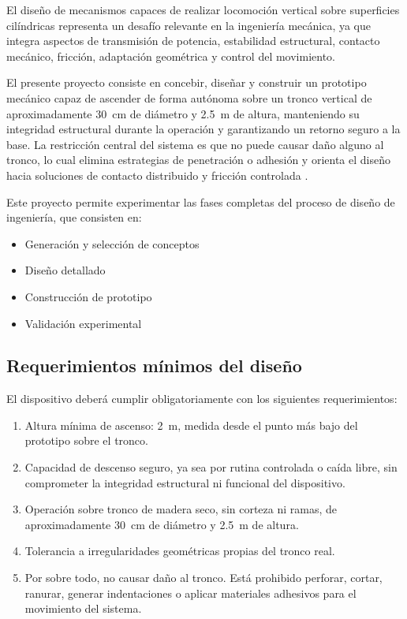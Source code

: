 \documentclass[lettersize,journal]{IEEEtran}
\begin{document}
El diseño de mecanismos capaces de realizar locomoción vertical sobre superficies
cilíndricas representa un desafío relevante en la ingeniería mecánica, ya que integra
aspectos de transmisión de potencia, estabilidad estructural, contacto mecánico,
fricción, adaptación geométrica y control del movimiento.

El presente proyecto consiste en concebir, diseñar y construir un prototipo mecánico
capaz de ascender de forma autónoma sobre un tronco vertical de aproximadamente
\SI{30}{\centi\meter} de diámetro y \SI{2.5}{\meter} de altura, manteniendo su
integridad estructural durante la operación y garantizando un retorno seguro a la base.
La restricción central del sistema es que no puede causar daño alguno al tronco, lo
cual elimina estrategias de penetración o adhesión y orienta el diseño hacia soluciones
de contacto distribuido y fricción controlada \cite{Vasiliauskas2001ForestryDamage,
RossnerEtAl2023BarkStripping}.

Este proyecto permite experimentar las fases completas del proceso de diseño de
ingeniería, que consisten en:

\begin{itemize}
    \item Generación y selección de conceptos
    \item Diseño detallado
    \item Construcción de prototipo
    \item Validación experimental
\end{itemize}

\subsection*{\textbf{Requerimientos mínimos del diseño}}

El dispositivo deberá cumplir obligatoriamente con los siguientes requerimientos:

\begin{enumerate}
    \item Altura mínima de ascenso: \SI{2}{\meter}, medida desde el punto más bajo
    del prototipo sobre el tronco.
    \item Capacidad de descenso seguro, ya sea por rutina controlada o caída libre,
    sin comprometer la integridad estructural ni funcional del dispositivo.
    \item Operación sobre tronco de madera seco, sin corteza ni ramas, de
    aproximadamente \SI{30}{\centi\meter} de diámetro y \SI{2.5}{\meter} de altura.
    \item Tolerancia a irregularidades geométricas propias del tronco real.
    \item Por sobre todo, no causar daño al tronco. Está prohibido perforar, cortar,
    ranurar, generar indentaciones o aplicar materiales adhesivos para el movimiento
    del sistema.
\end{enumerate}
\end{document}
